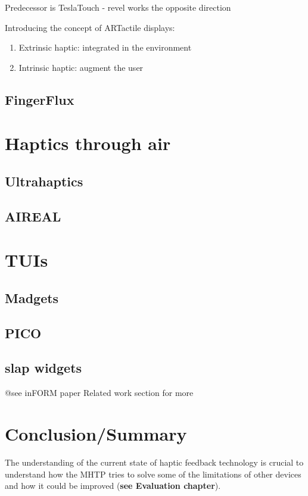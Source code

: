 Predecessor is TeslaTouch - revel works the opposite direction

Introducing the concept of ARTactile displays: 
\begin{enumerate}
	\item Extrinsic haptic: integrated in the environment
    \item Intrinsic haptic: augment the user
\end{enumerate}

\subsection{FingerFlux}

\section{Haptics through air}
\subsection{Ultrahaptics}
\subsection{AIREAL}

\section{TUIs}

\subsection{Madgets}
\subsection{PICO}
\subsection{slap widgets}

@see inFORM paper Related work section for more

\section{Conclusion/Summary}
The understanding of the current state of haptic feedback technology is crucial to understand how the MHTP tries to solve some of the limitations of other devices and how it could be improved (\textbf{see Evaluation chapter}). 